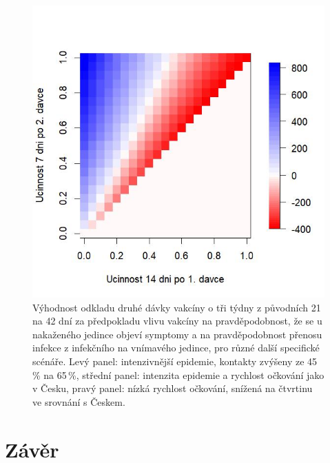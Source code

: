 \begin{figure}[h]
\begin{center}
\begin{minipage}[m]{0.3\linewidth}
		\end{minipage}
		\begin{minipage}[m]{0.3\linewidth}
			\includegraphics[width=\textwidth]{pic/SA4lessL_DIFF_mean_T.jpg}
		\end{minipage}
	\end{center}
	\caption{Výhodnost odkladu druhé dávky vakcíny o tři týdny z původních 21 na 42 dní za předpokladu vlivu vakcíny na pravděpodobnost, že se u nakaženého jedince objeví symptomy a na pravděpodobnost přenosu infekce z infekčního na vnímavého jedince, pro různé další specifické scénáře. Levý panel: intenzivnější epidemie, kontakty zvýšeny ze 45\,\% na 65\,\%, střední panel: intenzita epidemie a rychlost očkování jako v Česku, pravý panel: nízká rychlost očkování, snížená na čtvrtinu ve srovnání s Českem.}
	\label{figvacc3}
\end{figure}

\section*{Závěr}

